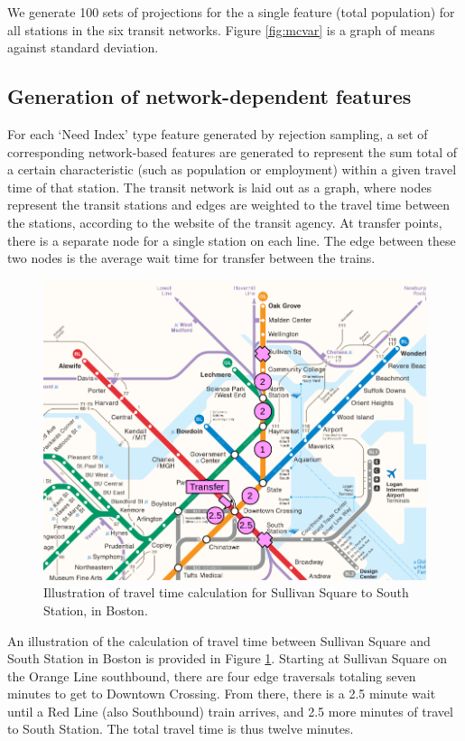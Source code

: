 \documentclass[11pt]{article}
\begin{document}
We generate 100 sets of projections for the a single feature (total population) for all stations in the six transit networks. Figure \ref{fig:mcvar} is a graph of means against standard deviation.

  

\subsection{Generation of network-dependent features}

For each `Need Index' type feature generated by rejection sampling, a set of corresponding network-based features are generated to represent the sum total of a certain characteristic (such as population or employment) within a given travel time of that station. The transit network is laid out as a graph, where nodes represent the transit stations and edges are weighted to the travel time between the stations, according to the website of the transit agency. At transfer points, there is a separate node for a single station on each line. The edge between these two nodes is the average wait time for transfer between the trains. 

\begin{figure}
\begin{center}\includegraphics[scale=0.7]{transfer_demonstration}\end{center}\caption{Illustration of travel time calculation for Sullivan Square to South Station, in Boston.}\label{fig:f2}
\end{figure}

An illustration of the calculation of travel time between Sullivan Square and South Station in Boston is provided in Figure \ref{fig:f2}. Starting at Sullivan Square on the Orange Line southbound, there are four edge traversals totaling seven minutes to get to Downtown Crossing. From there, there is a 2.5 minute wait until a Red Line (also Southbound) train arrives, and 2.5 more minutes of travel to South Station. The total travel time is thus twelve minutes. 
\end{document}
